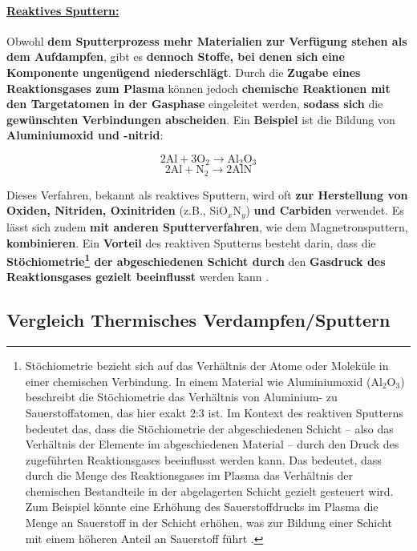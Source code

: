 \documentclass{article} %
\begin{document}
\vspace{1em}
\paragraph{\uline{Reaktives Sputtern:}} Obwohl \textbf{dem Sputterprozess mehr Materialien zur Verfügung stehen als dem Aufdampfen}, gibt es \textbf{dennoch 
Stoffe, bei denen sich eine Komponente ungenügend niederschlägt}. Durch die \textbf{Zugabe eines Reaktionsgases zum Plasma} können jedoch \textbf{chemische 
Reaktionen mit den Targetatomen in der Gasphase} eingeleitet werden, \textbf{sodass sich} die \textbf{gewünschten Verbindungen abscheiden}. Ein \textbf{Beispiel} 
ist die Bildung von \textbf{Aluminiumoxid und -nitrid}:

$$
\mathrm{2Al} + \mathrm{3O}_2 \rightarrow \mathrm{Al}_2\mathrm{O}_3
$$
$$
\mathrm{2Al} + \mathrm{N}_2 \rightarrow \mathrm{2AlN}
$$

Dieses Verfahren, bekannt als reaktives Sputtern, wird oft \textbf{zur Herstellung von Oxiden, Nitriden, Oxinitriden} (z.B., \(\mathrm{SiO}_x\mathrm{N}_y\)) 
\textbf{und Carbiden} verwendet. Es lässt sich zudem \textbf{mit anderen Sputterverfahren}, wie dem Magnetronsputtern, \textbf{kombinieren}. Ein \textbf{Vorteil} 
des reaktiven Sputterns besteht darin, dass die \textbf{Stöchiometrie\footnote{Stöchiometrie bezieht sich auf das Verhältnis der Atome oder Moleküle in einer 
chemischen Verbindung. In einem Material wie Aluminiumoxid (\(\mathrm{Al}_2\mathrm{O}_3\)) beschreibt die Stöchiometrie das Verhältnis von Aluminium- zu 
Sauerstoffatomen, das hier exakt 2:3 ist. Im Kontext des reaktiven Sputterns bedeutet das, dass die Stöchiometrie der abgeschiedenen Schicht -- also das 
Verhältnis der Elemente im abgeschiedenen Material -- durch den Druck des zugeführten Reaktionsgases beeinflusst werden kann. Das bedeutet, dass durch die Menge 
des Reaktionsgases im Plasma das Verhältnis der chemischen Bestandteile in der abgelagerten Schicht gezielt gesteuert wird. Zum Beispiel könnte eine Erhöhung des 
Sauerstoffdrucks im Plasma die Menge an Sauerstoff in der Schicht erhöhen, was zur Bildung einer Schicht mit einem höheren Anteil an Sauerstoff führt 
\cite{anders2010reactive, ohring2002, mattox2010handbook, rossnagel2003magnetron}.} der abgeschiedenen Schicht durch} den \textbf{Gasdruck des Reaktionsgases 
gezielt beeinflusst} werden kann \cite{keplinger2024}.

\vspace{1em}
\subsection{Vergleich Thermisches Verdampfen/Sputtern}
\end{document}
